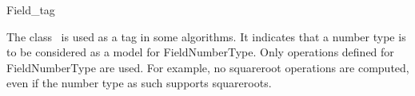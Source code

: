 \begin{ccRefClass} {Field_tag}

\ccDefinition

The class \ccRefName\ is used as a tag in some algorithms. It
indicates that a number type is to be considered as a model for
FieldNumberType. Only operations defined for FieldNumberType are used.
For example, no squareroot operations are computed, even if the number
type as such supports squareroots.


\ccSeeAlso
{} \\
 \\
 \\

\end{ccRefClass} 
